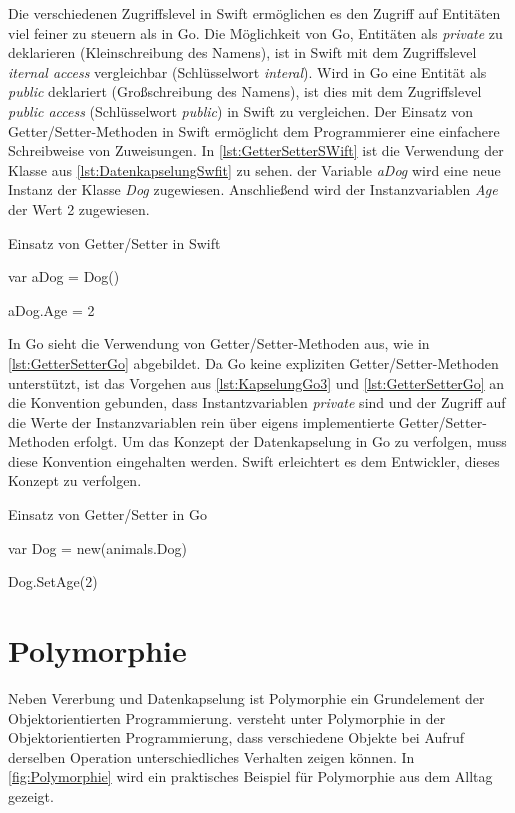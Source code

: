 Die verschiedenen Zugriffslevel in Swift ermöglichen es den Zugriff auf Entitäten viel feiner zu steuern als in Go.
Die Möglichkeit von Go, Entitäten als \textit{private} zu deklarieren (Kleinschreibung des Namens), ist in Swift mit dem Zugriffslevel \textit{iternal access} vergleichbar (Schlüsselwort \textit{interal}). 
Wird in Go eine Entität als \textit{public} deklariert (Großschreibung des Namens), ist dies mit dem Zugriffslevel \textit{public access} (Schlüsselwort \textit{public}) in Swift zu vergleichen.
Der Einsatz von Getter/Setter-Methoden in Swift ermöglicht dem Programmierer eine einfachere Schreibweise von Zuweisungen. 
In \autoref{lst:GetterSetterSWift} ist die Verwendung der Klasse aus \autoref{lst:DatenkapselungSwfit} zu sehen. 
der Variable \textit{aDog} wird eine neue Instanz der Klasse \textit{Dog} zugewiesen.
Anschließend wird der Instanzvariablen \textit{Age} der Wert 2 zugewiesen.

\begin{listing}
\caption{Einsatz von Getter/Setter in Swift}
\label{lst:GetterSetterSWift}
\begin{SwiftCode}
var aDog = Dog()

aDog.Age = 2

\end{SwiftCode}
\end{listing}

In Go sieht die Verwendung von Getter/Setter-Methoden aus, wie in \autoref{lst:GetterSetterGo} abgebildet.
Da Go keine expliziten Getter/Setter-Methoden unterstützt, ist das Vorgehen aus \autoref{lst:KapselungGo3} und \autoref{lst:GetterSetterGo} an die Konvention gebunden, dass Instantzvariablen \textit{private} sind und der Zugriff auf die Werte der Instanzvariablen rein über eigens implementierte Getter/Setter-Methoden erfolgt.
Um das Konzept der Datenkapselung in Go zu verfolgen, muss diese Konvention eingehalten werden.
Swift erleichtert es dem Entwickler, dieses Konzept zu verfolgen.

\begin{listing}
\caption{Einsatz von Getter/Setter in Go}
\label{lst:GetterSetterGo}
\begin{GoCode}
var Dog = new(animals.Dog)

Dog.SetAge(2)
\end{GoCode}
\end{listing}

\section{Polymorphie}
Neben Vererbung und Datenkapselung ist Polymorphie ein Grundelement der Objektorientierten Programmierung.
\cite[]{Lahres.2011} versteht unter Polymorphie in der Objektorientierten Programmierung, dass verschiedene Objekte bei Aufruf derselben Operation unterschiedliches Verhalten zeigen können. 
In \autoref{fig:Polymorphie} wird ein praktisches Beispiel für Polymorphie aus dem Alltag gezeigt. 

